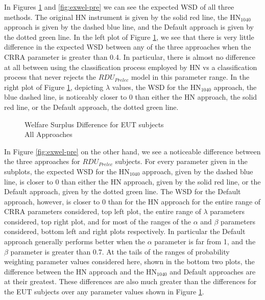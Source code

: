 \documentclass[../main.tex]{subfiles}
\begin{document}
In Figures \ref{fig:exwel-eut} and \ref{fig:exwel-pre} we can see the expected WSD of all three methods.
The original HN instrument is given by the solid red line, the $\text{HN}_{1040}$ approach is given by the dashed blue line, and the Default approach is given by the dotted green line.
In the left plot of Figure \ref{fig:exwel-eut}, we see that there is very little difference in the expected WSD between any of the three approaches when the CRRA parameter is greater than 0.4.
In particular, there is almost no difference at all between using the classification process employed by HN vs a classification process that never rejects the $\mathit{RDU_{Prelec}}$ model in this parameter range.
In the right plot of Figure \ref{fig:exwel-eut}, depicting $\lambda$ values, the WSD for the $\text{HN}_{1040}$ approach, the blue dashed line, is noticeably closer to 0 than either the HN approach, the solid red line, or the Default approach, the dotted green line.

\begin{figure}[ht!]
	\center
	\caption{Welfare Surplus Difference for EUT subjects\\All Approaches}
	\label{fig:exwel-eut}
\end{figure}

In Figure \ref{fig:exwel-pre} on the other hand, we see a noticeable difference between the three approaches for $\mathit{RDU_{Prelec}}$ subjects.
For every parameter given in the subplots, the expected WSD for the $\text{HN}_{1040}$ approach, given by the dashed blue line, is closer to 0 than either the HN approach, given by the solid red line, or the Default approach, given by the dotted green line.
The WSD for the Default approach, however, is closer to 0 than for the HN approach for the entire range of CRRA parameters considered, top left plot, the entire range of $\lambda$ parameters considered, top right plot, and for most of the ranges of the $\alpha$ and $\beta$ parameters considered, bottom left and right plots respectively.
In particular the Default approach generally performs better when the $\alpha$ parameter is far from 1, and the $\beta$ parameter is greater than 0.7.
At the tails of the ranges of probability weighting parameter values considered here, shown in the bottom two plots, the difference between the HN approach and the $\text{HN}_{1040}$ and Default approaches are at their greatest.
These differences are also much greater than the differences for the EUT subjects over any parameter values shown in Figure  \ref{fig:exwel-eut}.
\end{document}
